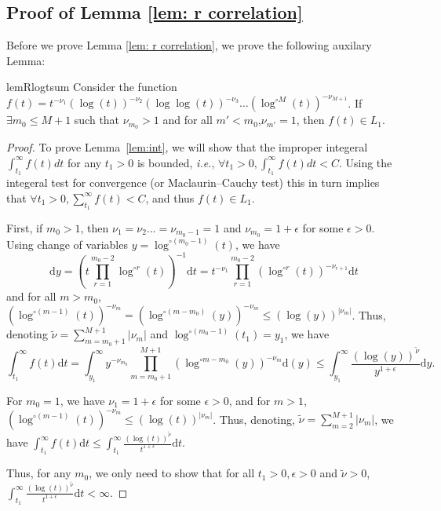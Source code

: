\documentclass[twoside,11pt,english]{article}
\begin{document}
\subsection{Proof of Lemma \ref{lem: r correlation}}
Before we prove Lemma \ref{lem: r correlation}, we prove the following auxilary Lemma:
\begin{restatable}{lemR}{logtsum}\label{lem:logtsum}
Consider the function $f(t)=t^{-\nu_1}(\log(t))^{-\nu_2}(\log\log(t))^{-\nu_3}\ldots(\log^{\circ M}(t))^{-\nu_{M+1}}$. If $\exists m_0\le M+1$ such that $\nu_{m_0}>1$ and for all $m'<m_0$,$\nu_{m'}=1$, then $f(t)\in L_1$. \label{lem:int}
\end{restatable}
\begin{proof}To prove Lemma~\ref{lem:int}, we will show that the improper integeral $\int_{t_1}^\infty f(t)dt$ for any $t_1>0$ is bounded, \emph{i.e.}, $\forall t_1>0,\int_{t_1}^\infty f(t)dt<C$. Using the integeral test for convergence (or Maclaurin--Cauchy test) this in turn implies that $\forall t_1>0,\sum_{t_1}^\infty f(t)<C$, and thus $f(t)\in L_1$.

First, if $m_0>1$, then $\nu_1=\nu_2\ldots=\nu_{m_0-1}=1$ and $\nu_{m_0}=1+\epsilon$ for some $\epsilon>0$.  Using change of variables $y=\log^{\circ (m_0-1)}(t)$, we have 
\[
\mathrm{d}y=\left(t\prod_{r=1}^{m_0-2}\log^{\circ r}(t)\right)^{-1}\mathrm{d}t=t^{-\nu_1}\prod_{r=1}^{m_0-2}\left(\log^{\circ r}(t)\right)^{-\nu_{r+1}}\mathrm{d}t
\]
and for all $m>m_0$,  $\left(\log^{\circ (m-1)}(t)\right)^{-\nu_{m}}=\left(\log^{\circ( m-m_0)}(y)\right)^{-\nu_{m}}\le\left(\log(y)\right)^{|\nu_{m}|}$. Thus, denoting $\tilde{\nu}=\sum_{m=m_0+1}^{M+1}|\nu_{m}|$ and $\log^{\circ (m_0-1)}(t_1)=y_1$, we have 
\begin{equation}\label{eq:logsum}
    \int_{t_1}^\infty f(t)\mathrm{d}t=\int_{y_1}^\infty y^{-\nu_{m_0}}\prod_{m=m_0+1}^{M+1} \left(\log^{\circ m-m_0}(y)\right)^{-\nu_{m}}\mathrm{d}(y)\le \int_{y_1}^{\infty}\frac{\left(\log(y)\right)^{\tilde{\nu}}}{y^{1+\epsilon}} \mathrm{d}y.
\end{equation}

For $m_0=1$, we  have $\nu_1=1+\epsilon$ for some $\epsilon>0$, and for $m>1$, $\left(\log^{\circ (m-1)}(t)\right)^{-\nu_{m}}\le\left(\log(t)\right)^{|\nu_{m}|}$. Thus, denoting, $\tilde{\nu}=\sum_{m=2}^{M+1}|\nu_{m}|$, we have  $\int_{t_1}^\infty f(t)\mathrm{d}t\le \int_{t_1}^\infty\frac{\left(\log(t)\right)^{\tilde{\nu}}}{t^{1+\epsilon}} \mathrm{d}t$. 


Thus, for any $m_0$, we only need to show that for all $t_1>0,\epsilon>0$ and $\tilde{\nu}>0$, $\int_{t_1}^\infty\frac{\left(\log(t)\right)^{\tilde{\nu}}}{t^{1+\epsilon}} \mathrm{d}t<\infty.$


\end{proof}
\end{document}
